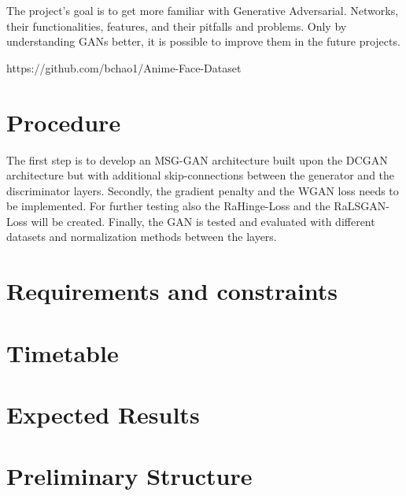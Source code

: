 \documentclass[conference,onecolumn,compsoc]{IEEEtran}
\begin{document}
\noindent
The project's goal is to get more familiar with Generative Adversarial. 
Networks, their functionalities, features, and their pitfalls and problems. 
Only by understanding GANs better, it is possible to improve them in the future 
projects.

https://github.com/bchao1/Anime-Face-Dataset


\section{Procedure}

\noindent
The first step is to develop an MSG-GAN \cite{karnewar2020msggan} architecture 
built upon the DCGAN \cite{radford2016unsupervised} architecture but with
additional skip-connections between the generator and the 
discriminator layers. Secondly, the gradient penalty and the WGAN loss needs to be
implemented. For further testing also the RaHinge-Loss and the RaLSGAN-Loss 
will be created. Finally, the GAN is tested and evaluated with different
datasets and normalization methods between the layers.

\section{Requirements and constraints}

\blindtext

\section{Timetable}

\noindent
\blindtext \cite{yazıcı2019unusual}

\section{Expected Results}

\noindent
\blindtext


\section{Preliminary  Structure}
\end{document}
